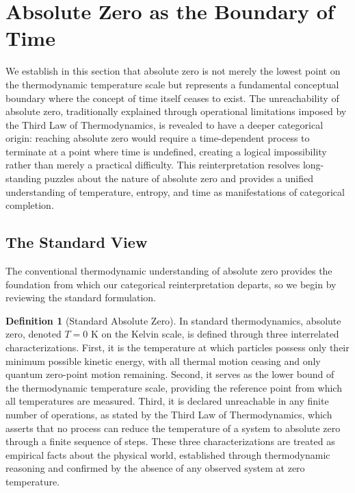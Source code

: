 \documentclass[12pt,a4paper]{article}
\theoremstyle{definition}
\newtheorem{definition}[theorem]{Definition}
\theoremstyle{remark}
\begin{document}
\section{Absolute Zero as the Boundary of Time}
\label{sec:absolute_zero}

We establish in this section that absolute zero is not merely the lowest point on the thermodynamic temperature scale but represents a fundamental conceptual boundary where the concept of time itself ceases to exist. The unreachability of absolute zero, traditionally explained through operational limitations imposed by the Third Law of Thermodynamics, is revealed to have a deeper categorical origin: reaching absolute zero would require a time-dependent process to terminate at a point where time is undefined, creating a logical impossibility rather than merely a practical difficulty. This reinterpretation resolves long-standing puzzles about the nature of absolute zero and provides a unified understanding of temperature, entropy, and time as manifestations of categorical completion.

\subsection{The Standard View}

The conventional thermodynamic understanding of absolute zero provides the foundation from which our categorical reinterpretation departs, so we begin by reviewing the standard formulation.

\begin{definition}[Standard Absolute Zero]
In standard thermodynamics, absolute zero, denoted $T = 0$ K on the Kelvin scale, is defined through three interrelated characterizations. First, it is the temperature at which particles possess only their minimum possible kinetic energy, with all thermal motion ceasing and only quantum zero-point motion remaining. Second, it serves as the lower bound of the thermodynamic temperature scale, providing the reference point from which all temperatures are measured. Third, it is declared unreachable in any finite number of operations, as stated by the Third Law of Thermodynamics, which asserts that no process can reduce the temperature of a system to absolute zero through a finite sequence of steps. These three characterizations are treated as empirical facts about the physical world, established through thermodynamic reasoning and confirmed by the absence of any observed system at zero temperature.
\end{definition}
\end{document}
